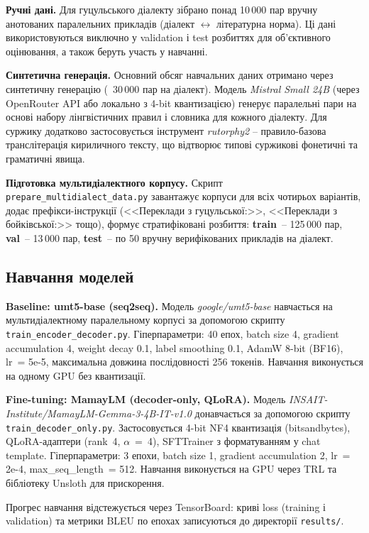 \documentclass[14pt]{extarticle}
\begin{document}
\textbf{Ручні дані.} Для гуцульського діалекту зібрано понад 10\,000 пар вручну анотованих паралельних прикладів (діалект $\leftrightarrow$ літературна норма). Ці дані використовуються виключно у validation і test розбиттях для об'єктивного оцінювання, а також беруть участь у навчанні.

\textbf{Синтетична генерація.} Основний обсяг навчальних даних отримано через синтетичну генерацію (~30\,000 пар на діалект). Модель \textit{Mistral Small 24B} (через OpenRouter API або локально з 4-bit квантизацією) генерує паралельні пари на основі набору лінгвістичних правил і словника для кожного діалекту. Для суржику додатково застосовується інструмент \textit{rutorphy2} -- правило-базова транслітерація кириличного тексту, що відтворює типові суржикові фонетичні та граматичні явища.

\textbf{Підготовка мульти\-діалектного корпусу.} Скрипт \texttt{prepare\_multidialect\_data.py} завантажує корпуси для всіх чотирьох варіантів, додає префікси-інструкції (<<Переклади з гуцульської:>>, <<Переклади з бойківської:>> тощо), формує стратифіковані розбиття: \textbf{train}~-- 125\,000 пар, \textbf{val}~-- 13\,000 пар, \textbf{test}~-- по 50 вручну верифікованих прикладів на діалект.

\subsection{Навчання моделей}

\textbf{Baseline: umt5-base (seq2seq).} Модель \textit{google/umt5-base} навчається на мульти\-діалектному паралельному корпусі за допомогою скрипту \texttt{train\_encoder\_decoder.py}. Гіперпараметри: 40 епох, batch size 4, gradient accumulation 4, weight decay 0.1, label smoothing 0.1, AdamW 8-bit (BF16), lr~= 5e-5, максимальна довжина послідовності 256 токенів. Навчання виконується на одному GPU без квантизації.

\textbf{Fine-tuning: MamayLM (decoder-only, QLoRA).} Модель \textit{INSAIT-Institute/MamayLM-Gemma-3-4B-IT-v1.0} донавчається за допомогою скрипту \texttt{train\_decoder\_only.py}. Застосовується 4-bit NF4 квантизація (bitsandbytes), QLoRA-адаптери (rank~4, $\alpha$~=~4), SFTTrainer з форматуванням у chat template. Гіперпараметри: 3 епохи, batch size 1, gradient accumulation 2, lr~= 2e-4, max\_seq\_length~= 512. Навчання виконується на GPU через TRL та бібліотеку Unsloth для прискорення.

Прогрес навчання відстежується через TensorBoard: криві loss (training і validation) та метрики BLEU по епохах записуються до директорії \texttt{results/}.
\end{document}
